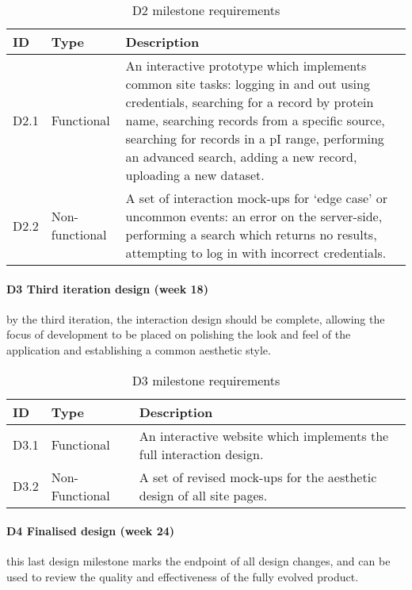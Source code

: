 \begin{table}[H]
\centering
\begin{tabular}{ l l p{12cm} }
\textbf{ID} & \textbf{Type} & \textbf{Description}\\ \hline

D2.1 & Functional & An interactive prototype which implements common site tasks:
logging in and out using credentials, searching for a record by protein name,
searching records from a specific source, searching for records in a pI range,
performing an advanced search, adding a new record, uploading a new dataset.\\

D2.2 & Non-functional & A set of interaction mock-ups for ‘edge case’ or
uncommon events: an error on the server-side, performing a search which returns
no results, attempting to log in with incorrect credentials.\\

\hline
\end{tabular}
\caption{D2 milestone requirements}
\label{tab:d2-requirements}
\end{table}

\paragraph{D3 Third iteration design (week 18)} by the third iteration, the
interaction design should be complete, allowing the focus of development to be
placed on polishing the look and feel of the application and establishing a
common aesthetic style.

\begin{table}[H]
\centering
\begin{tabular}{ l l p{12cm} }
\textbf{ID} & \textbf{Type} & \textbf{Description}\\ \hline

D3.1 & Functional & An interactive website which implements the full interaction
design.\\

D3.2 & Non-Functional & A set of revised mock-ups for the aesthetic design of
all site pages.\\

\hline
\end{tabular}
\caption{D3 milestone requirements}
\label{tab:d3-requirements}
\end{table}

\paragraph{D4 Finalised design (week 24)} this last design milestone marks the
endpoint of all design changes, and can be used to review the quality and
effectiveness of the fully evolved product.

